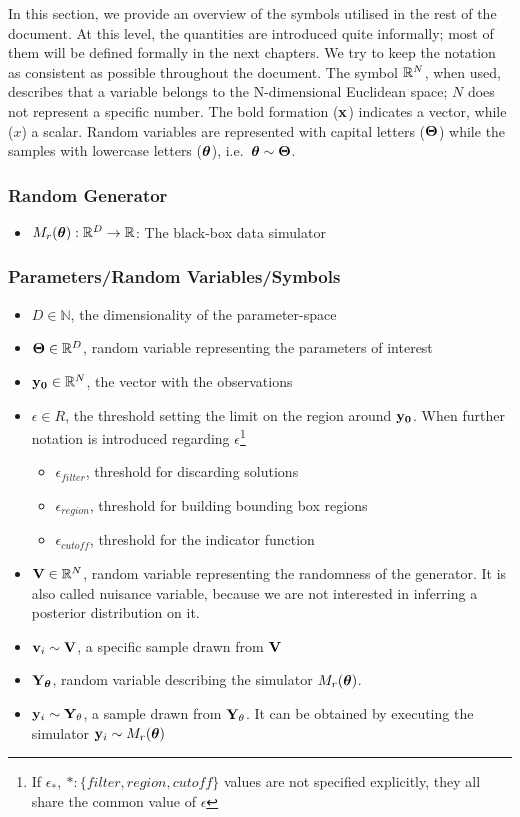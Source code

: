 In this section, we provide an overview of the symbols utilised in the
rest of the document. At this level, the quantities are introduced
quite informally; most of them will be defined formally in the next
chapters. We try to keep the notation as consistent as possible
throughout the document. The symbol $\mathbb{R}^N$, when used, describes that
a variable belongs to the $\text{N-dimensional}$ Euclidean space; $N$
does not represent a specific number. The bold formation ($\mathbf{x}$)
indicates a vector, while ($x$) a scalar. Random variables are
represented with capital letters ($\mathbf{\Theta}$) while the samples with
lowercase letters ($\boldsymbol{\theta}$), i.e.\ $\boldsymbol{\theta} \sim \mathbf{\Theta}$.

\subsubsection*{Random Generator}
\label{sec:random-generator}
\begin{itemize}
\item $M_r(\boldsymbol{\theta}): \mathbb{R}^D \rightarrow \mathbb{R}$: The black-box data simulator
\end{itemize}

\subsubsection*{Parameters/Random Variables/Symbols}
\label{sec:variables}

\begin{itemize}
\item $D \in \mathbb{N}$, the dimensionality of the parameter-space
\item $\mathbf{\Theta} \in \mathbb{R}^D$, random variable representing the parameters of interest
\item $\mathbf{y_0} \in \mathbb{R}^N$, the vector with the observations
\item $\epsilon \in R$, the threshold setting the limit on the region
  around $\mathbf{y_0}$. When further notation is introduced
  regarding $\epsilon$\footnote{If
    $\epsilon_*, \: *:\{filter, region, cutoff\}$ values are not specified
    explicitly, they all share the common value of $\epsilon$}
  \begin{itemize}
  \item $\epsilon_{filter}$, threshold for discarding solutions
  \item $\epsilon_{region}$, threshold for building bounding box regions
  \item $\epsilon_{cutoff}$, threshold for the indicator function
  \end{itemize}
  
\item $\mathbf{V} \in \mathbb{R}^N$, random variable representing the randomness of
  the generator. It is also called nuisance variable, because we are
  not interested in inferring a posterior distribution on it.
\item $\mathbf{v}_i \sim \mathbf{V}$, a specific sample drawn from $\mathbf{V}$
\item $\mathbf{Y}_{\boldsymbol{\theta}}$, random variable describing the simulator $M_r(\boldsymbol{\theta})$. 
\item $\mathbf{y}_i \sim \mathbf{Y}_\theta$, a sample drawn from $\mathbf{Y}_\theta$. It can
  be obtained by executing the simulator $\mathbf{y}_i \sim M_r(\boldsymbol{\theta})$
\end{itemize}


